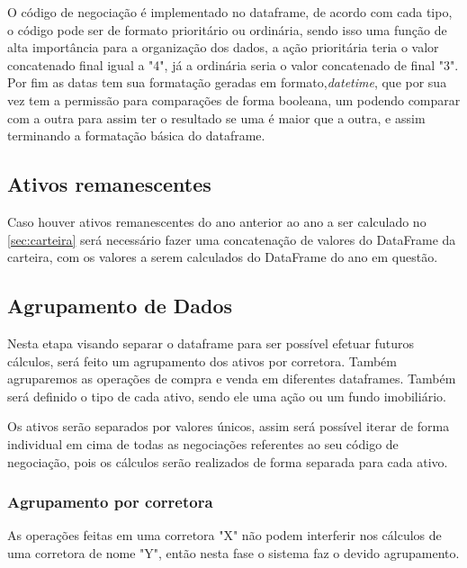 \par O código de negociação é implementado no dataframe, de acordo com cada tipo, o código pode ser de formato prioritário ou ordinária, sendo isso uma função de alta importância para a organização dos dados, a ação prioritária teria o valor concatenado final igual a "4", já a ordinária seria o valor concatenado de final "3". Por fim as datas tem sua formatação geradas em formato,\textit{datetime}, que por sua vez tem a permissão para comparações de forma booleana, um podendo comparar com a outra para assim ter o resultado se uma é maior que a outra, e assim terminando a formatação básica do dataframe.

\subsection{Ativos remanescentes}

\par Caso houver ativos remanescentes do ano anterior ao ano a ser calculado no \autoref{sec:carteira} será necessário fazer uma concatenação de valores do DataFrame da carteira, com os valores a serem calculados do DataFrame do ano em questão.
\subsection{\textbf{Agrupamento de Dados}}

\par Nesta etapa visando separar o dataframe para ser possível efetuar futuros cálculos, será feito um agrupamento dos ativos por corretora. Também agruparemos as operações de compra e venda em diferentes dataframes. Também será definido o tipo de cada ativo, sendo ele uma ação ou um fundo imobiliário.



\par Os ativos serão separados por valores únicos, assim será possível iterar de forma individual em cima de todas as negociações referentes ao seu código de negociação, pois os cálculos serão realizados de forma separada para cada ativo.

\subsubsection{\textbf{Agrupamento por corretora}}

\par As operações feitas em uma corretora "X" não podem interferir nos cálculos de uma corretora de nome "Y", então nesta fase o sistema faz o devido agrupamento. 
 
